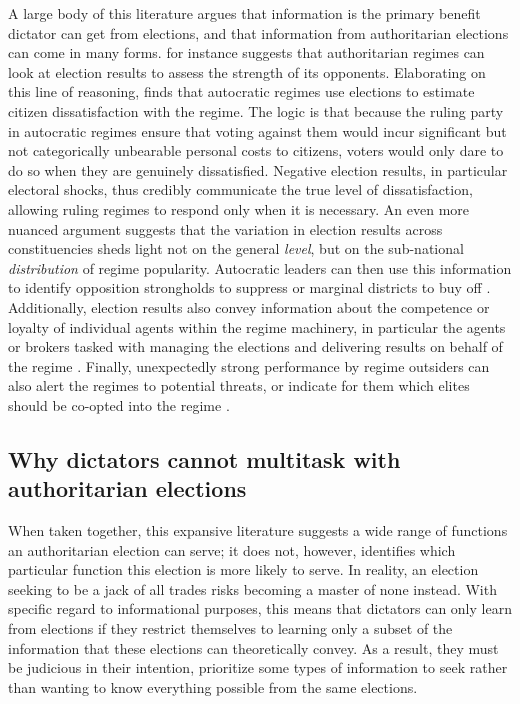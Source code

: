 \documentclass[12pt]{article}
\newcommand{\1}{\mathbbm{1}}
\begin{document}
A large body of this literature argues that information is the primary benefit dictator can get from elections, and that information from authoritarian elections can come in many forms. \cite{Geddes2005} for instance suggests that authoritarian regimes can look at election results to assess the strength of its opponents. Elaborating on this line of reasoning, \cite{Miller2015} finds that autocratic regimes use elections to estimate citizen dissatisfaction with the regime. The logic is that because the ruling party in autocratic regimes ensure that voting against them would incur significant but not categorically unbearable personal costs to citizens, voters would only dare to do so when they are genuinely dissatisfied. Negative election results, in particular electoral shocks, thus credibly communicate the true level of dissatisfaction, allowing ruling regimes to respond only when it is necessary. An even more nuanced argument suggests that the variation in election results across constituencies sheds light not on the general \textit{level}, but on the sub-national \textit{distribution} of regime popularity. Autocratic leaders can then use this information to identify opposition strongholds to suppress \citep{Magaloni2006, Blaydes2008} or marginal districts to buy off \citep{Reed2001, Magaloni2006}. Additionally, election results also convey information about the competence or loyalty of individual agents within the regime machinery, in particular the agents or brokers tasked with managing the elections and delivering results on behalf of the regime \citep{Magaloni2006, Blaydes2008, Myagkov2009, RundlettSvolik2016}. Finally, unexpectedly strong performance by regime outsiders can also alert the regimes to potential threats, or indicate for them which elites should be co-opted into the regime \cite{LustOkar2005}.

\subsection{Why dictators cannot multitask with authoritarian elections}
\label{sec:theory_priority}

When taken together, this expansive literature suggests a wide range of functions an authoritarian election can serve; it does not, however, identifies which particular function this election is more likely to serve. In reality, an election seeking to be a jack of all trades risks becoming a master of none instead. With specific regard to informational purposes, this means that dictators can only learn from elections if they restrict themselves to learning only a subset of the information that these elections can theoretically convey. As a result, they must be judicious in their intention, prioritize some types of information to seek rather than wanting to know everything possible from the same elections.
\end{document}
